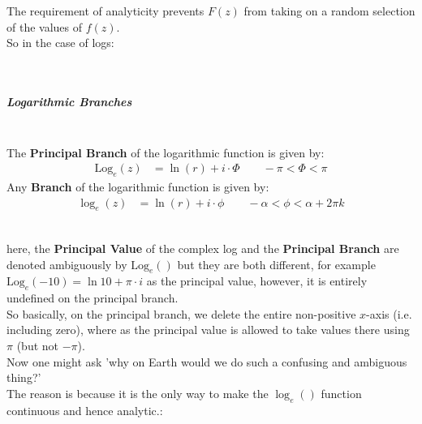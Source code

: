 \documentclass[class=article, crop=false]{standalone}
\begin{document}
\hfill\begin{minipage}{\dimexpr\textwidth-3cm}
  The requirement of analyticity prevents $F\left( z \right) $ from taking on a random selection of the values of $f\left( z \right) $.\\
  So in the case of logs:\\
\end{minipage}

\ \

\hfill\begin{minipage}{\dimexpr\textwidth-3cm}
\begin{tcolorbox}

  \subparagraph{Logarithmic Branches}\ \\

  The \textbf{Principal Branch} of the logarithmic function is given by:
  \begin{align}
   \mathrm{Log}_e{\left( z \right) } &= \ln{ \left( r \right)  } +  i \cdot \Phi \qquad -\pi < \Phi < \pi
    \label{pblog}
  \end{align}
  Any \textbf{Branch} of the logarithmic function is given by:
  \begin{align}
    \log_e{\left( z \right) } &= \ln{ \left( r \right)  } +  i \cdot \phi \qquad -\alpha < \phi <\alpha + 2 \pi k
    \label{branchlogdef}
  \end{align}
\end{tcolorbox}

\end{minipage}
\ \\

 here, the \textbf{Principal Value} of the complex log and the \textbf{Principal Branch} are denoted ambiguously by $\mathrm{Log}_e{\left(  \right) }$ but they are both different, for example $\mathrm{Log}_e{\left( -10 \right) }= \ln{ 10 } +  \pi\cdot i$ as the principal value, however, it is entirely undefined on the principal branch.\\

 So basically, on the principal branch, we delete the entire non-positive $x$-axis (i.e. including zero), where as the principal value is allowed to take values there using $\pi$ (but not $-\pi$).\\

 Now one might ask 'why on Earth would we do such a confusing and ambiguous thing?'\\
 The reason is because it is the only way to make the $\log_e{\left(  \right) }$ function continuous and hence analytic.:\\
 \ \
\end{document}
